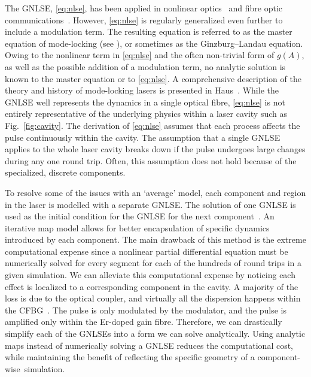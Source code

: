 \documentclass[9pt,twocolumn,twoside]{osajnl}
\begin{document}
The GNLSE, \eqref{eq:nlse}, has been applied in nonlinear optics~\cite{agrawal2013} and fibre optic communications~\cite{agrawal2002}. However, \eqref{eq:nlse} is regularly generalized even further to include a modulation term. The resulting equation is referred to as the master equation of mode-locking (see \cite{haus1975, haus1984, haus2000, tamura1996, usechak2005}), or sometimes as the Ginzburg--Landau equation. Owing to the nonlinear term in \eqref{eq:nlse} and the often non-trivial form of $g(A)$, as well as the possible addition of a modulation term, no analytic solution is known to the master equation or to \eqref{eq:nlse}. A comprehensive description of the theory and history of mode-locking lasers is presented in Haus~\cite{haus2000}. While the GNLSE well represents the dynamics in a single optical fibre, \eqref{eq:nlse} is not entirely representative of the underlying physics within a laser cavity such as Fig.~\ref{fig:cavity}. The derivation of \eqref{eq:nlse} assumes that each process affects the pulse continuously within the cavity. The assumption that a single GNLSE applies to the whole laser cavity breaks down if the pulse undergoes large changes during any one round trip. Often, this assumption does not hold because of the specialized, discrete components.

To resolve some of the issues with an `average' model, each component and region in the laser is modelled with a separate GNLSE. The solution of one GNLSE is used as the initial condition for the GNLSE for the next component~\cite{lapre2019, meng2020, oktem2010, woodward2018}. An iterative map model allows for better encapsulation of specific dynamics introduced by each component. The main drawback of this method is the extreme computational expense since a nonlinear partial differential equation must be numerically solved for every segment for each of the hundreds of round trips in a given simulation. We can alleviate this computational expense by noticing each effect is localized to a corresponding component in the cavity. A majority of the loss is due to the optical coupler, and virtually all the dispersion happens within the CFBG~\cite{agrawal2002}. The pulse is only modulated by the modulator, and the pulse is amplified only within the Er-doped gain fibre. Therefore, we can drastically simplify each of the GNLSEs into a form we can solve analytically. Using analytic maps instead of numerically solving a GNLSE reduces the computational cost, while maintaining the benefit of reflecting the specific geometry of a component-wise~simulation.
\end{document}
